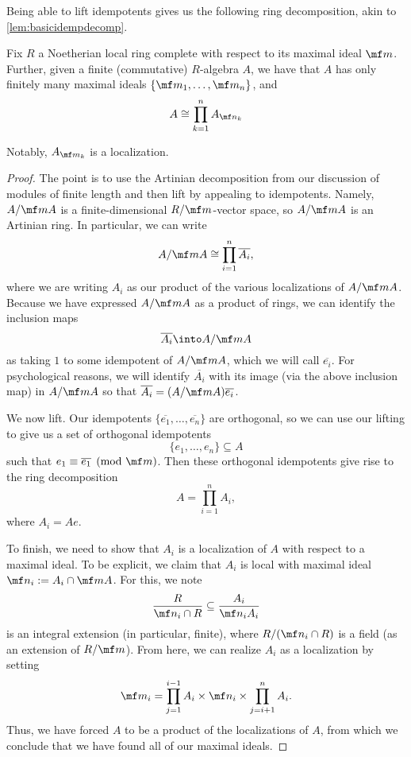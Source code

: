 Being able to lift idempotents gives us the following ring decomposition, akin to \autoref{lem:basicidempdecomp}.
\begin{lemma}
	Fix $R$ a Noetherian local ring complete with respect to its maximal ideal $\mf m$. Further, given a finite (commutative) $R$-algebra $A$, we have that $A$ has only finitely many maximal ideals $\{\mf m_1,\ldots,\mf m_n\}$, and
	\[A\cong\prod_{k=1}^nA_{\mf n_k}\]
\end{lemma}
Notably, $A_{\mf m_k}$ is a localization.
\begin{proof}
	The point is to use the Artinian decomposition from our discussion of modules of finite length and then lift by appealing to idempotents. Namely, $A/\mf mA$ is a finite-dimensional $R/\mf m$-vector space, so $A/\mf mA$ is an Artinian ring. In particular, we can write
	\[A/\mf mA\cong\prod_{i=1}^n\overline{A_i},\]
	where we are writing $A_i$ as our product of the various localizations of $A/\mf mA$. Because we have expressed $A/\mf mA$ as a product of rings, we can identify the inclusion maps
	\[\overline{A_i}\into A/\mf mA\]
	as taking $1$ to some idempotent of $A/\mf mA$, which we will call $\overline{e_i}$. For psychological reasons, we will identify $\overline{A_i}$ with its image (via the above inclusion map) in $A/\mf mA$ so that $\overline{A_i}=(A/\mf mA)\overline{e_i}$. %

	We now lift. Our idempotents $\{\overline{e_1},\ldots,\overline{e_n}\}$ are orthogonal, so we can use our lifting to give us a set of orthogonal idempotents
	\[\{e_1,\ldots,e_n\}\subseteq A\]
	such that $e_1\equiv\overline{e_1}\pmod{\mf m}$. Then these orthogonal idempotents give rise to the ring decomposition
	\[A=\prod_{i=1}^nA_i,\]
	where $A_i=Ae$.

	To finish, we need to show that $A_i$ is a localization of $A$ with respect to a maximal ideal. To be explicit, we claim that $A_i$ is local with maximal ideal $\mf n_i:=A_i\cap\mf mA$. For this, we note
	\[\frac{R}{\mf n_i\cap R}\subseteq\frac{A_i}{\mf n_iA_i}\]
	is an integral extension (in particular, finite), where $R/(\mf n_i\cap R)$ is a field (as an extension of $R/\mf m$). From here, we can realize $A_i$ as a localization by setting
	\[\mf m_i=\prod_{j=1}^{i-1}A_i\times\mf n_i\times\prod_{j=i+1}^nA_i.\]
	Thus, we have forced $A$ to be a product of the localizations of $A$, from which we conclude that we have found all of our maximal ideals.
\end{proof}

